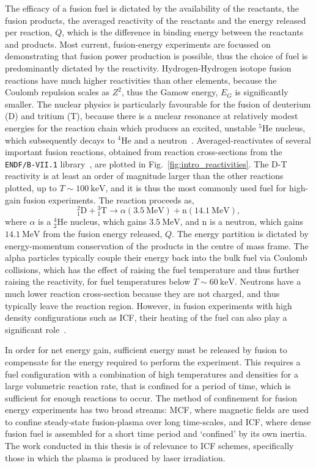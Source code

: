 The efficacy of a fusion fuel is dictated by the availability of the reactants, the fusion products, the averaged reactivity of the reactants and the energy released per reaction, $Q$, which is the difference in binding energy between the reactants and products.
Most current, fusion-energy experiments are focussed on demonstrating that fusion power production is possible, thus the choice of fuel is predominantly dictated by the reactivity.
Hydrogen-Hydrogen isotope fusion reactions have much higher reactivities than other elements, because the Coulomb repulsion scales as $Z^2$, thus the Gamow energy, $E_G$ is significantly smaller.
The nuclear physics is particularly favourable for the fusion of deuterium (D) and tritium (T), because there is a nuclear resonance at relatively modest energies for the reaction chain which produces an excited, unstable ${}^5 \text{He}$ nucleus, which subsequently decays to ${}^4\text{He}$ and a neutron~\cite{brown_field_2014}.
Averaged-reactivates of several important fusion reactions, obtained from reaction cross-sections from the \texttt{ENDF/B-VII.1} library~\cite{chadwick_endfb-vii1_2011}, are plotted in Fig.~\ref{fig:intro_reactivities}.
The D-T reactivity is at least an order of magnitude larger than the other reactions plotted, up to $T\sim100\ \text{keV}$, and it is thus the most commonly used fuel for high-gain fusion experiments.
The reaction proceeds as,
\begin{equation}
    \label{eq:intro_DTreac}
    {}^{2}_{1}\text{D} + {}^{3}_{1}\text{T} \rightarrow \alpha(3.5\ \text{MeV}) + \text{n}(14.1\ \text{MeV}),
\end{equation}
where $\alpha$ is a ${}^{4}_{2}\text{He}$ nucleus, which gains $3.5\ \text{MeV}$, and $\text{n}$ is a neutron, which gains $14.1\ \text{MeV}$ from the fusion energy released, $Q$.
The energy partition is dictated by energy-momentum conservation of the products in the centre of mass frame.
The alpha particles typically couple their energy back into the bulk fuel via Coulomb collisions, which has the effect of raising the fuel temperature and thus further raising the reactivity, for fuel temperatures below $T\sim60\ \text{keV}$.
Neutrons have a much lower reaction cross-section because they are not charged, and thus typically leave the reaction region.
However, in fusion experiments with high density configurations such as \ac{ICF}, their heating of the fuel can also play a significant role~\cite{daughton_influence_2023}.

In order for net energy gain, sufficient energy must be released by fusion to compensate for the energy required to perform the experiment.
This requires a fuel configuration with a combination of high temperatures and densities for a large volumetric reaction rate, that is confined for a period of time, which is sufficient for enough reactions to occur.
The method of confinement for fusion energy experiments has two broad streams: \ac{MCF}, where magnetic fields are used to confine steady-state fusion-plasma over long time-scales, and \ac{ICF}, where dense fusion fuel is assembled for a short time period and `confined' by its own inertia.
The work conducted in this thesis is of relevance to \ac{ICF} schemes, specifically those in which the plasma is produced by laser irradiation.

